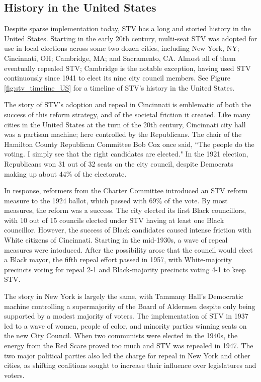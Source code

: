 \documentclass{amsart}
\theoremstyle{definition}
\begin{document}
\subsection{History in the United States}
Despite sparse implementation today, STV has a long and storied history in the United States.
Starting in the early 20th century, multi-seat STV was adopted for use in local elections across some two dozen cities,
including New York, NY; Cincinnati, OH; Cambridge, MA; and Sacramento, CA. Almost all of them eventually repealed STV;
Cambridge is the notable exception, having used STV continuously since 1941 to elect
its nine city council members. 
See Figure \ref{fig:stv_timeline_US} for a timeline of STV's history in the United States.

The story of STV's adoption and repeal in Cincinnati is emblematic of both the success of this reform strategy, 
and of the societal friction it created. Like many cities in the United States at the turn of the 20th century, 
Cincinnati city hall was a partisan machine; here controlled by the Republicans. 
The chair of the Hamilton County Republican Committee Bob Cox once said, ``The people do the voting. 
I simply see that the right candidates are elected."
In the 1921 election, Republicans won 31 out of 32 seats on the city council, despite Democrats
making up about 44\% of the electorate.

In response, reformers from the Charter Committee introduced an STV reform measure to the 1924 ballot,
which passed with 69\% of the vote. By most measures, the reform was a success. 
The city elected its first Black councillors, with 10 out of 15 councils elected under STV having
at least one Black councillor.
However, the success of Black candidates caused intense friction with White citizens of Cincinnati.
Starting in the mid-1930s, a wave of repeal measures were intoduced.
After the possibility arose that the council would elect a Black mayor, the fifth repeal 
effort passed in 1957, with White-majority precincts voting for repeal 2-1 and Black-majority 
precincts voting 4-1 to keep STV. 

The story in New York is largely the same, with Tammany Hall's Democratic machine controlling a 
supermajority of the Board of Aldermen despite only being supported by a modest majority of voters. 
The implementation of STV in 1937 led 
to a wave of women, people of color, and minority parties winning seats on the new City Council. 
When two communists were elected in the 1940s, the energy from the Red Scare proved too much and 
STV was repealed in 1947. The two major political parties also led the charge for repeal in New York 
and other cities, as shifting coalitions sought to increase their influence over legislatures and voters. 
\end{document}
